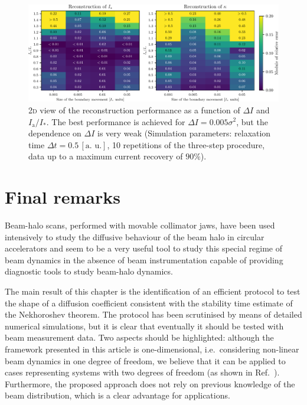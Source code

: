 {\begin{figure}[t]
    \centering
    \includegraphics[width=\textwidth]{4_probing_the_diffusive_behavior/figs/final/MULTI_different_step_size.pdf}
    \caption{2\textsc{d} view of the reconstruction performance as a function of $\Delta I$ and $I_\mathrm{a}/I_\ast$. The  best performance is achieved for $\Delta I = 0.005 \sigma^2$, but the dependence on $\Delta I$ is very weak (Simulation parameters: relaxation time $\Delta t=0.5 \, [\text{a. u.}]$, 10 repetitions of the three-step procedure, data up to a maximum current recovery of $90\%$).}
    \label{fig:different_movement_module}
\end{figure}


\section{Final remarks}
\label{sec:conclusions}


Beam-halo scans, performed with movable collimator jaws, have been used intensively to study the diffusive behaviour of the beam halo in circular accelerators and seem to be a very useful tool to study this special regime of beam dynamics in the absence of beam instrumentation capable of providing diagnostic tools to study beam-halo dynamics.

{The main result of this chapter} is the identification of an efficient protocol to test the shape of {a diffusion coefficient consistent with the stability time estimate of the Nekhoroshev theorem}. The protocol has been scrutinised by means of detailed numerical simulations, but it is clear that eventually it should be tested with beam measurement data. Two aspects should be highlighted: although the framework presented in this article is one-dimensional, i.e.\ considering non-linear beam dynamics in one degree of freedom, we believe that it can be applied to cases representing systems with two degrees of freedom (as shown in Ref.~\cite{bazzani2020diffusion}). Furthermore, the proposed approach does not rely on previous knowledge of the beam distribution, which is a clear advantage for applications. 
 
}
